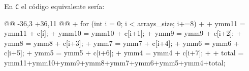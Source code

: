 \par En \texttt{C} el código equivalente sería:
\begin{listing}[firstnumber=35]
    @@ -36,3 +36,11 @@
    + for (int i = 0; i < arrays_size; i+=8)
    + {
    +    ymm11 = ymm11 + c[i];
    +    ymm10 = ymm10 + c[i+1];
    +    ymm9 = ymm9 + c[i+2];
    +    ymm8 = ymm8 + c[i+3];
    +    ymm7 = ymm7 + c[i+4];
    +    ymm6 = ymm6 + c[i+5];
    +    ymm5 = ymm5 + c[i+6];
    +    ymm4 = ymm4 + c[i+7];
    + }
    + total = ymm11+ymm10+ymm9+ymm8+ymm7+ymm6+ymm5+ymm4+total;
\end{listing}